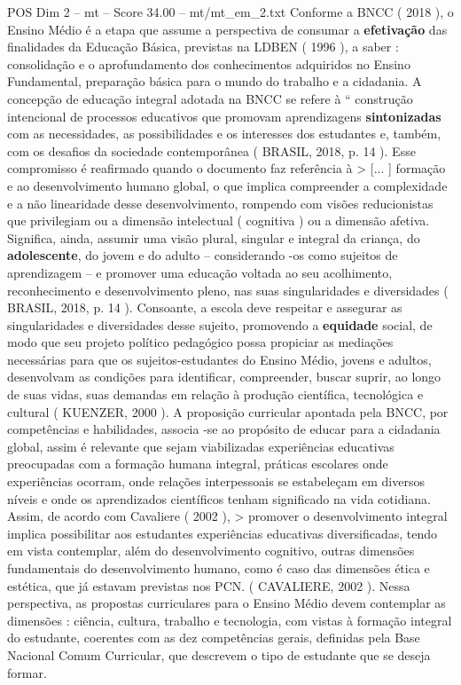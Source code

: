 \begin{textsample}{POS Dim 2 – mt – Score 34.00 – mt/mt\_em\_2.txt}
Conforme a BNCC ( 2018 ), o Ensino Médio é a etapa que assume a perspectiva de consumar a \textbf{efetivação} das finalidades da Educação Básica, previstas na LDBEN ( 1996 ), a saber : consolidação e o aprofundamento dos conhecimentos adquiridos no Ensino Fundamental, preparação básica para o mundo do trabalho e a cidadania.
A concepção de educação integral adotada na BNCC se refere à “ construção intencional de processos educativos que promovam aprendizagens \textbf{sintonizadas} com as necessidades, as possibilidades e os interesses dos estudantes e, também, com os desafios da sociedade contemporânea ( BRASIL, 2018, p. 14 ).
Esse compromisso é reafirmado quando o documento faz referência à > [... ] formação e ao desenvolvimento humano global, o que implica compreender a complexidade e a não linearidade desse desenvolvimento, rompendo com visões reducionistas que privilegiam ou a dimensão intelectual ( cognitiva ) ou a dimensão afetiva.
Significa, ainda, assumir uma visão plural, singular e integral da criança, do \textbf{adolescente}, do jovem e do adulto – considerando -os como sujeitos de aprendizagem – e promover uma educação voltada ao seu acolhimento, reconhecimento e desenvolvimento pleno, nas suas singularidades e diversidades ( BRASIL, 2018, p. 14 ).
Consoante, a escola deve respeitar e assegurar as singularidades e diversidades desse sujeito, promovendo a \textbf{equidade} social, de modo que seu projeto político pedagógico possa propiciar as mediações necessárias para que os sujeitos-estudantes do Ensino Médio, jovens e adultos, desenvolvam as condições para identificar, compreender, buscar suprir, ao longo de suas vidas, suas demandas em relação à produção científica, tecnológica e cultural ( KUENZER, 2000 ).
A proposição curricular apontada pela BNCC, por competências e habilidades, associa -se ao propósito de educar para a cidadania global, assim é relevante que sejam viabilizadas experiências educativas preocupadas com a formação humana integral, práticas escolares onde experiências ocorram, onde relações interpessoais se estabeleçam em diversos níveis e onde os aprendizados científicos tenham significado na vida cotidiana.
Assim, de acordo com Cavaliere ( 2002 ), > promover o desenvolvimento integral implica possibilitar aos estudantes experiências educativas diversificadas, tendo em vista contemplar, além do desenvolvimento cognitivo, outras dimensões fundamentais do desenvolvimento humano, como é caso das dimensões ética e estética, que já estavam previstas nos PCN. ( CAVALIERE, 2002 ).
Nessa perspectiva, as propostas curriculares para o Ensino Médio devem contemplar as dimensões : ciência, cultura, trabalho e tecnologia, com vistas à formação integral do estudante, coerentes com as dez competências gerais, definidas pela Base Nacional Comum Curricular, que descrevem o tipo de estudante que se deseja formar.

\end{textsample}
